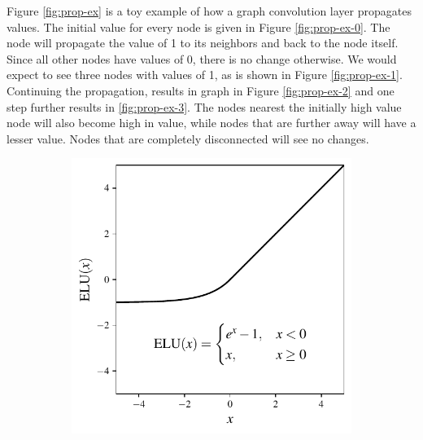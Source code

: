 \documentclass[../thesis.tex]{subfiles}
\begin{document}
\par Figure \ref{fig:prop-ex} is a toy example of how a graph convolution layer propagates values.
The initial value for every node is given in Figure \ref{fig:prop-ex-0}.
The node will propagate the value of 1 to its neighbors and back to the node itself.
Since all other nodes have values of 0, there is no change otherwise.
We would expect to see three nodes with values of 1, as is shown in Figure \ref{fig:prop-ex-1}.
Continuing the propagation, results in graph in Figure \ref{fig:prop-ex-2} and one step further results in \ref{fig:prop-ex-3}.
The nodes nearest the initially high value node will also become high in value, while nodes that are further away will have a lesser value.
Nodes that are completely disconnected will see no changes.

\begin{figure}[t]
	\centering
	\begin{subfigure}{0.49\textwidth}
		\includegraphics[width=\textwidth]{figures/elu.pdf}
	\end{subfigure}
	\hfill
	\begin{subfigure}{0.49\textwidth}

\end{subfigure}
\end{figure}
\end{document}
